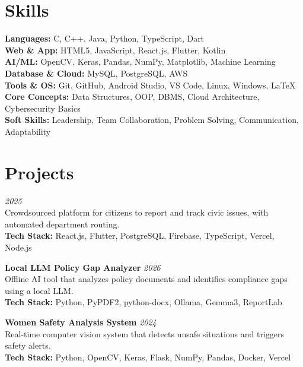 \documentclass[10pt,a4paper]{article}
\begin{document}
\vspace{3pt}
\section*{Skills}
\sectionrule
\textbf{Languages:} C, C++, Java, Python, TypeScript, Dart\\
\textbf{Web \& App:} HTML5, JavaScript, React.js, Flutter, Kotlin\\
\textbf{AI/ML:} OpenCV, Keras, Pandas, NumPy, Matplotlib, Machine Learning\\
\textbf{Database \& Cloud:} MySQL, PostgreSQL, AWS\\
\textbf{Tools \& OS:} Git, GitHub, Android Studio, VS Code, Linux, Windows, LaTeX\\
\textbf{Core Concepts:} Data Structures, OOP, DBMS, Cloud Architecture, Cybersecurity Basics\\
\textbf{Soft Skills:} Leadership, Team Collaboration, Problem Solving, Communication, Adaptability
\vspace{3pt}

\section*{Projects}
\sectionrule
{}\hfill \textit{2025}\\
Crowdsourced platform for citizens to report and track civic issues, with automated department routing.\\
\textbf{Tech Stack:} React.js, Flutter, PostgreSQL, Firebase, TypeScript, Vercel, Node.js
\vspace{4pt}

\noindent\textbf{Local LLM Policy Gap Analyzer} \hfill \textit{2026}\\
Offline AI tool that analyzes policy documents and identifies compliance gaps using a local LLM.\\
\textbf{Tech Stack:} Python, PyPDF2, python-docx, Ollama, Gemma3, ReportLab
\vspace{4pt}

\noindent\textbf{Women Safety Analysis System} \hfill \textit{2024}\\
Real-time computer vision system that detects unsafe situations and triggers safety alerts.\\
\textbf{Tech Stack:} Python, OpenCV, Keras, Flask, NumPy, Pandas, Docker, Vercel
\vspace{4pt}
\end{document}
